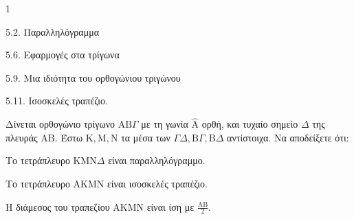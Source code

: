 \begin{ylh}{1}
    \item 5.2. Παραλληλόγραμμα
    \item 5.6. Εφαρμογές στα τρίγωνα
    \item 5.9. Μια ιδιότητα του ορθογώνιου τριγώνου
    \item 5.11. Ισοσκελές τραπέζιο.
\end{ylh}
Δίνεται ορθογώνιο τρίγωνο $\mathrm{A}\mathrm{B}\Gamma$ με τη γωνία $\hat{\mathrm{A}}$ ορθή, και τυχαίο σημείο $\Delta$ της πλευράς $\mathrm{A}\mathrm{B}$. Έστω $\mathrm{K}, \mathrm{M}, \mathrm{N}$ τα μέσα των $\Gamma\Delta, \mathrm{B}\Gamma, \mathrm{B}\Delta$ αντίστοιχα.
Να αποδείξετε ότι:
\begin{alist}
    \item Το τετράπλευρο $\mathrm{K}\mathrm{M}\mathrm{N}\Delta$ είναι παραλληλόγραμμο. 
    \item Το τετράπλευρο $\mathrm{A}\mathrm{K}\mathrm{M}\mathrm{N}$ είναι ισοσκελές τραπέζιο. 
    \item Η διάμεσος του τραπεζίου $\mathrm{A}\mathrm{K}\mathrm{M}\mathrm{N}$ είναι ίση με $\frac{\mathrm{A}\mathrm{B}}{2}$. 
\end{alist}
